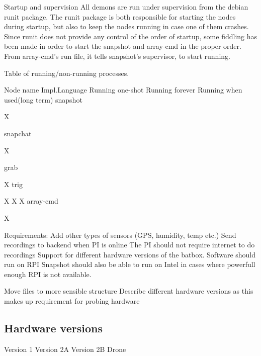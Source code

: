 Startup and supervision
All demons are run under supervision from the debian runit package. The runit package is both responsible for starting the nodes during startup, but also to keep the nodes running in case one of them crashes. Since runit does not provide any control of the order of startup, some fiddling has been made in order to start the snapshot and array-cmd in the proper order. From array-cmd’s run file, it tells snapshot’s supervisor, to start running.

Table of running/non-running processes.


Node name
Impl.Language
Running one-shot
Running forever
Running when used(long term)
snapshot




X


snapchat


X




grab






X
trig


X
X
X
array-cmd




X




Requirements:
Add other types of sensors (GPS, humidity, temp etc.)
Send recordings to backend when PI is online
The PI should not require internet to do recordings
Support for different hardware versions of the batbox.
Software should run on RPI
Snapshot should also be able to run on Intel in cases where powerfull enough RPI is not available.




Move files to more sensible structure
Describe different hardware versions as this makes up requirement for probing hardware

\subsection{Hardware versions}
Version 1
Version 2A
Version 2B
Drone



